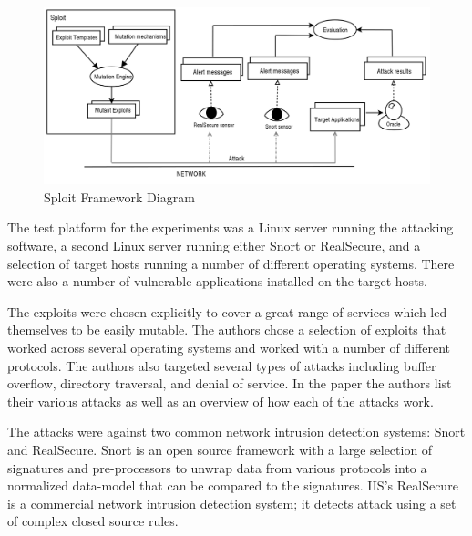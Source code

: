 \documentclass{reading_glasses}
\begin{document}
\begin{figure}
	\centering
	\includegraphics[width=1.0\textwidth]{SploitFramework.png}
	\caption{Sploit Framework Diagram}
	\label{fig:sploitF}
\end{figure}

The test platform for the experiments was a Linux server running the attacking software, a second Linux server running either Snort or RealSecure, and a selection of target hosts running a number of different operating systems.  There were also a number of vulnerable applications installed on the target hosts. \cite{vigna2004testing}

The exploits were chosen explicitly to cover a great range of services which led themselves to be easily mutable.  The authors chose a selection of exploits that worked across several operating systems and worked with a number of different protocols.  The authors also targeted several types of attacks including buffer overflow, directory traversal, and denial of service.  In the paper the authors list their various attacks as well as an overview of how each of the attacks work. \cite{vigna2004testing}

The attacks were against two common network intrusion detection systems: Snort and RealSecure.  Snort is an open source framework with a large selection of signatures and pre-processors to unwrap data from various protocols into a normalized data-model that can be compared to the signatures.  IIS's RealSecure is a commercial network intrusion detection system; it detects attack using a set of complex closed source rules.\cite{vigna2004testing}
\end{document}

